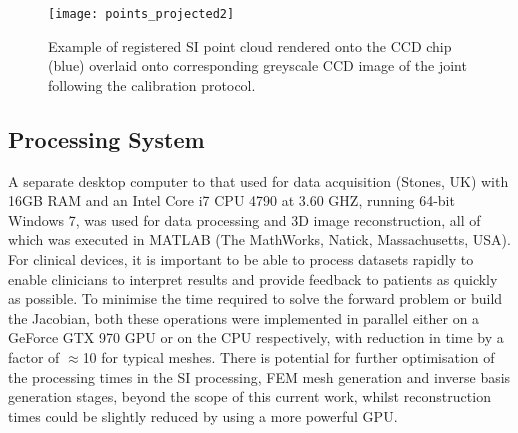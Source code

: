 \documentclass[twoside]{bhamthesis}
\theoremstyle{definition}
\begin{document}
\begin{figure}[!ht]
\texttt{[image: points\_projected2]}
\centering
\caption{Example of registered SI point cloud rendered onto the CCD chip (blue) overlaid onto corresponding greyscale CCD image of the joint following the calibration protocol.}
\centering
\label{fig:points_projected}
\end{figure}


\subsection{Processing System}
A separate desktop computer to that used for data acquisition (Stones, UK) with 16GB RAM and an Intel Core i7 CPU 4790 at 3.60 GHZ, running 64-bit Windows 7, was used for data processing and 3D image reconstruction, all of which was executed in MATLAB (The MathWorks, Natick, Massachusetts, USA). For clinical devices, it is important to be able to process datasets rapidly to enable clinicians to interpret results and provide feedback to patients as quickly as possible. To minimise the time required to solve the forward problem or build the Jacobian, both these operations were implemented in parallel \cite{doulgerakis2017towards} either on a GeForce GTX 970 GPU or on the CPU respectively, with reduction in time by a factor of $\approx$10 for typical meshes. There is potential for further optimisation of the processing times in the SI processing, FEM mesh generation and inverse basis generation stages, beyond the scope of this current work, whilst reconstruction times could be slightly reduced by using a more powerful GPU. 
\end{document}
